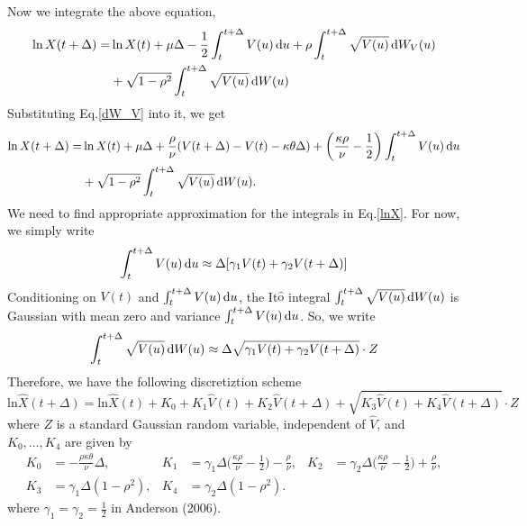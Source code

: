 \documentclass{ws-ijfe}
\begin{document}
Now we integrate the above equation,
\begin{equation*}
\begin{split}
  \ln X(t+\Delta)=&\ln X(t) +\mu\Delta-\frac{1}{2}\int_{t}^{t+\Delta}V(u)\,\mathrm{d} u +\rho\int_{t}^{t+\Delta}\sqrt{V(u)}\,\mathrm{d} W_V(u)\\ &+\sqrt{1-\rho^2}\int_{t}^{t+\Delta}\sqrt{V(u)}\,\mathrm{d} W(u)
\end{split}
\end{equation*}
Substituting Eq.\eqref{dW_V} into it, we get
\begin{equation}\label{lnX}
\begin{split}
   \ln X(t+\Delta)=&\ln X(t)+\mu\Delta+\frac{\rho}{\nu}(V(t+\Delta)-V(t)-\kappa\theta\Delta)+\bigg(\frac{\kappa\rho}{\nu}-\frac{1}{2}\bigg)\int_{t}^{t+\Delta}V(u)\,\d u\\
    &+\sqrt{1-\rho^2}\int_{t}^{t+\Delta}\sqrt{V(u)}\,\d W(u).
\end{split}
\end{equation}
We need to find appropriate approximation for the integrals in Eq.\eqref{lnX}. For now, we simply write
\begin{equation}\label{approx_du}
  \int_{t}^{t+\Delta}V(u)\,\d u \approx \Delta[\gamma_1 V(t)+\gamma_2 V(t+\Delta)]
\end{equation}
Conditioning on $V(t)$ and $\int_{t}^{t+\Delta}V(u)\,\mathrm{d} u$, the It$\hat{\text{o}}$ integral
$
  \int_{t}^{t+\Delta}\sqrt{V(u)}\,\mathrm{d} W(u)
$
is Gaussian with mean zero and variance $\int_{t}^{t+\Delta}V(u)\,\mathrm{d} u$. So, we write
\begin{equation*}
  \int_{t}^{t+\Delta}\sqrt{V(u)}\,\mathrm{d} W(u)\approx \Delta\sqrt{\gamma_1V(t)+\gamma_2V(t+\Delta)}\cdot Z
\end{equation*}
Therefore, we have the following discretiztion scheme
\begin{equation}\label{eq3}
  \text{ln}\hat{X}(t+\Delta)=\text{ln}\hat{X}(t)+K_0+K_1\hat{V}(t)+K_2\hat{V}(t+\Delta)+\sqrt{K_3\hat{V}(t)+K_4\hat{V}(t+\Delta)}\cdot Z
\end{equation}
where $Z$ is a standard Gaussian random variable, independent of $\hat{V}$, and $K_0,\dots,K_4$ are given by
\begin{align*}
  K_0&=-\frac{\rho\kappa\theta}{\nu}\Delta, &
  K_1&=\gamma_1\Delta\bigg(\frac{\kappa\rho}{\nu}-\frac{1}{2}\bigg)-\frac{\rho}{\nu}, &  K_2&=\gamma_2\Delta\bigg(\frac{\kappa\rho}{\nu}-\frac{1}{2}\bigg)+\frac{\rho}{\nu}, \\ K_3&=\gamma_1\Delta(1-\rho^2), & K_4&=\gamma_2\Delta(1-\rho^2).
\end{align*}
where $\gamma_1=\gamma_2=\frac{1}{2}$ in Anderson (2006).
\end{document}
